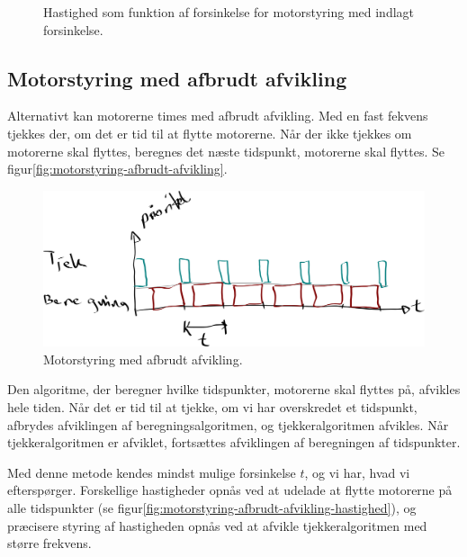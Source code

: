 \begin{figure}[htbp]
  \centering
  \vspace{3cm}
  \caption{Hastighed som funktion af forsinkelse for motorstyring med
    indlagt forsinkelse.}
  \label{fig:motorstyring-indlagt-forsinkelse-timing}
\end{figure}


\subsection{Motorstyring med afbrudt afvikling}

Alternativt kan motorerne times med afbrudt afvikling. Med en fast
fekvens tjekkes der, om det er tid til at flytte motorerne. Når der
ikke tjekkes om motorerne skal flyttes, beregnes det næste tidspunkt,
motorerne skal flyttes. Se
figur\vref{fig:motorstyring-afbrudt-afvikling}.

\begin{figure}[htbp]
  \centering
  \includegraphics[width=.8\textwidth]{../brugere/kjaergaard/motorstyring-afbrudt-afvikling}
  \caption{Motorstyring med afbrudt afvikling.}
  \label{fig:motorstyring-afbrudt-afvikling}
\end{figure}

Den algoritme, der beregner hvilke tidspunkter, motorerne skal flyttes
på, afvikles hele tiden. Når det er tid til at tjekke, om vi har
overskredet et tidspunkt, afbrydes afviklingen af
beregningsalgoritmen, og tjekkeralgoritmen afvikles. Når
tjekkeralgoritmen er afviklet, fortsættes
afviklingen af beregningen af tidspunkter.

Med denne metode kendes mindst mulige forsinkelse $t$, og vi har, hvad
vi efterspørger. Forskellige hastigheder opnås ved at udelade at
flytte motorerne på alle tidspunkter (se
figur\vref{fig:motorstyring-afbrudt-afvikling-hastighed}), og
præcisere styring af hastigheden opnås ved at afvikle
tjekkeralgoritmen med større frekvens. 

